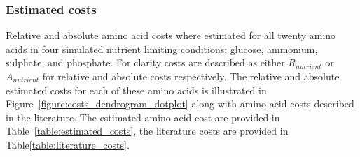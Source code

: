 \subsubsection{Estimated costs}

Relative and absolute amino acid costs where estimated for all twenty amino acids in four simulated nutrient limiting conditions: glucose, ammonium, sulphate, and phosphate. For clarity costs are described as either $R_{nutrient}$ or $A_{nutrient}$ for relative and absolute costs respectively. The relative and absolute estimated costs for each of these amino acids is illustrated in Figure~\vref{figure:costs_dendrogram_dotplot} along with amino acid costs described in the literature. The estimated amino acid cost are provided in Table~\vref{table:estimated_costs}, the literature costs are provided in Table\vref{table:literature_costs}.


